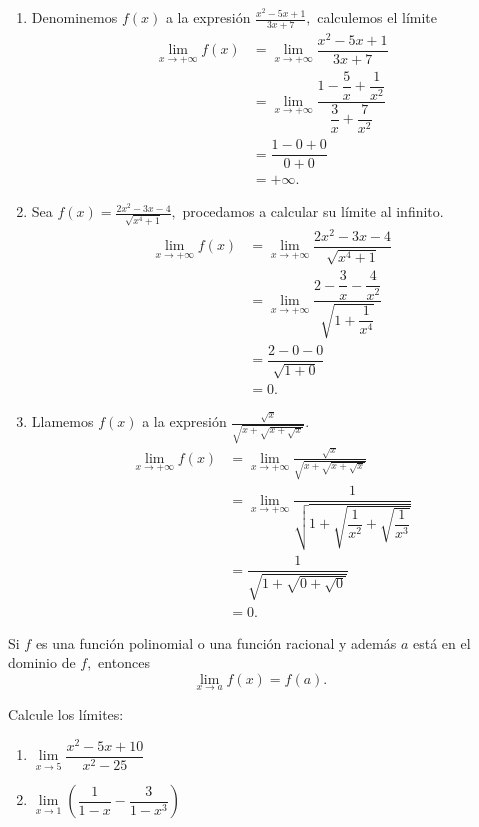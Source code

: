 \begin{example}
	\begin{enumerate}
		\item Denominemos \(f(x)\) a la expresi\'on \(\frac{x^2-5x+1}{3x+7},\) calculemos el l\'imite
		\begin{align*}
		\lim\limits_{x\to+\infty}f(x)&=\lim\limits_{x\to+\infty}\dfrac{x^2-5x+1}{3x+7}\\
		&=\lim\limits_{x\to+\infty}\dfrac{1-\dfrac{5}{x}+\dfrac{1}{x^2}}{\dfrac{3}{x}+\dfrac{7}{x^2}}\\
		&=\dfrac{1-0+0}{0+0}\\
		&=+\infty.
		\end{align*}
		
		\item Sea \(f(x)=\frac{2x^2-3x-4}{\sqrt{x^4+1}},\) procedamos a calcular su l\'imite al infinito.
		\begin{align*}
		\lim\limits_{x\to+\infty}f(x)&=\lim\limits_{x\to+\infty}\dfrac{2x^2-3x-4}{\sqrt{x^4+1}}\\
		&=\lim\limits_{x\to+\infty}\dfrac{2-\dfrac{3}{x}-\dfrac{4}{x^2}}{\sqrt{1+\dfrac{1}{x^4}}}\\
		&=\dfrac{2-0-0}{\sqrt{1+0}}\\
		&=0.
		\end{align*}
		
		\item Llamemos \(f(x)\) a la expresi\'on \(\frac{\sqrt{x}}{\sqrt{x+\sqrt{x+\sqrt{x}}}}.\)
		\begin{align*}
		\lim\limits_{x\to+\infty}f(x)&=\lim\limits_{x\to+\infty}\frac{\sqrt{x}}{\sqrt{x+\sqrt{x+\sqrt{x}}}}\\
		&=\lim\limits_{x\to+\infty}\dfrac{1}{\sqrt{1+\sqrt{\dfrac{1}{x^2}+\sqrt{\dfrac{1}{x^3}}}}}\\
		&=\dfrac{1}{\sqrt{1+\sqrt{0+\sqrt	{0}}}}\\
		&=0.
		\end{align*}
	\end{enumerate}
\end{example}


\begin{property}
	Si \(f\) es una funci\'on polinomial o una funci\'on racional y adem\'as \(a\) est\'a en el dominio de \(f,\) entonces
	\[\lim\limits_{x\to a}f(x)=f(a).\]
\end{property}
\begin{exercise}
	Calcule los l\'imites:
	\begin{enumerate}
		\item \(\lim\limits_{x\to 5}\dfrac{x^2-5x+10}{x^2-25} \)
		\item  \(\lim\limits_{x\to 1}\left(\dfrac{1}{1-x}-\dfrac{3}{1-x^3}\right)\)
	\end{enumerate}	
\end{exercise}

